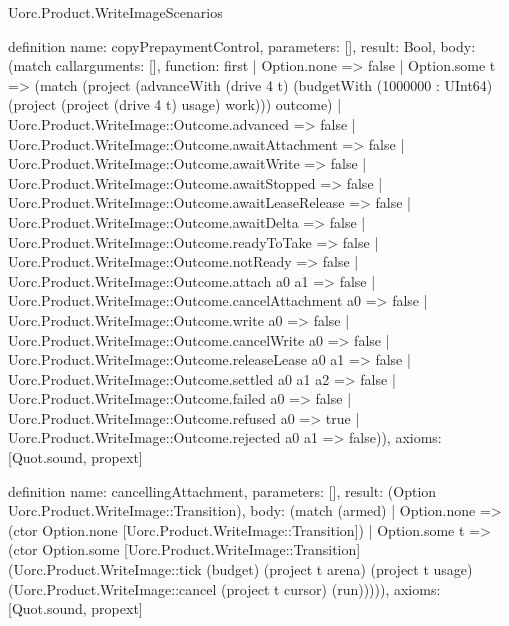 \begin{lexlean}{Uorc.Product.WriteImageScenarios}
\begin{semanticmodule}
definition{
  name: copyPrepaymentControl,
  parameters: [],
  result: Bool,
  body: (match call{arguments: [], function: first}
    | Option.none => false
    | Option.some t => (match (project (advanceWith (drive 4 t) (budgetWith (1000000 : UInt64) (project (project (drive 4 t) usage) work))) outcome)
      | Uorc.Product.WriteImage::Outcome.advanced => false
      | Uorc.Product.WriteImage::Outcome.awaitAttachment => false
      | Uorc.Product.WriteImage::Outcome.awaitWrite => false
      | Uorc.Product.WriteImage::Outcome.awaitStopped => false
      | Uorc.Product.WriteImage::Outcome.awaitLeaseRelease => false
      | Uorc.Product.WriteImage::Outcome.awaitDelta => false
      | Uorc.Product.WriteImage::Outcome.readyToTake => false
      | Uorc.Product.WriteImage::Outcome.notReady => false
      | Uorc.Product.WriteImage::Outcome.attach a0 a1 => false
      | Uorc.Product.WriteImage::Outcome.cancelAttachment a0 => false
      | Uorc.Product.WriteImage::Outcome.write a0 => false
      | Uorc.Product.WriteImage::Outcome.cancelWrite a0 => false
      | Uorc.Product.WriteImage::Outcome.releaseLease a0 a1 => false
      | Uorc.Product.WriteImage::Outcome.settled a0 a1 a2 => false
      | Uorc.Product.WriteImage::Outcome.failed a0 => false
      | Uorc.Product.WriteImage::Outcome.refused a0 => true
      | Uorc.Product.WriteImage::Outcome.rejected a0 a1 => false)),
  axioms: [Quot.sound, propext]
}

definition{
  name: cancellingAttachment,
  parameters: [],
  result: (Option Uorc.Product.WriteImage::Transition),
  body: (match (armed)
    | Option.none => (ctor Option.none [Uorc.Product.WriteImage::Transition])
    | Option.some t => (ctor Option.some [Uorc.Product.WriteImage::Transition] (Uorc.Product.WriteImage::tick (budget) (project t arena) (project t usage) (Uorc.Product.WriteImage::cancel (project t cursor) (run))))),
  axioms: [Quot.sound, propext]
}


\end{semanticmodule}
\end{lexlean}
